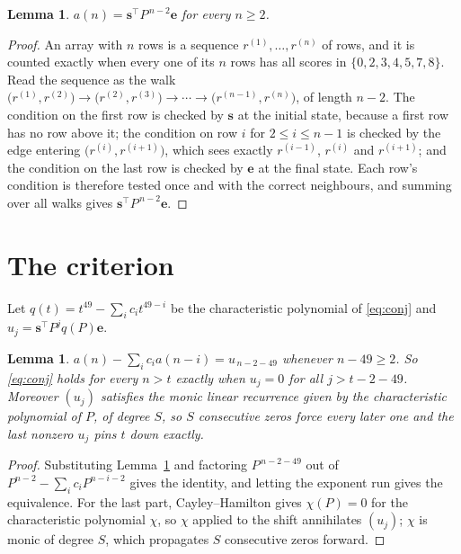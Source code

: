\documentclass[11pt,a4paper]{article}
\theoremstyle{plain}
\newtheorem{lemma}[theorem]{Lemma}
\theoremstyle{definition}
\begin{document}
\begin{lemma}\label{lem:walk}
$a(n)=\mathbf{s}^{\!\top}P^{\,n-2}\mathbf{e}$ for every $n\ge2$.
\end{lemma}

\begin{proof}
An array with $n$ rows is a sequence $r^{(1)},\dots,r^{(n)}$ of rows, and it is counted
exactly when every one of its $n$ rows has all scores in $\{0,2,3,4,5,7,8\}$. Read the sequence as the
walk $\bigl(r^{(1)},r^{(2)}\bigr)\to\bigl(r^{(2)},r^{(3)}\bigr)\to\cdots\to
\bigl(r^{(n-1)},r^{(n)}\bigr)$, of length $n-2$. The condition on the first row is
checked by $\mathbf{s}$ at the initial state, because a first row has no row above it; the
condition on row $i$ for $2\le i\le n-1$ is checked by the edge entering
$\bigl(r^{(i)},r^{(i+1)}\bigr)$, which sees exactly $r^{(i-1)}$, $r^{(i)}$ and
$r^{(i+1)}$; and the condition on the last row is checked by $\mathbf{e}$ at the final
state. Each row's condition is therefore tested once and with the correct neighbours, and
summing over all walks gives $\mathbf{s}^{\!\top}P^{\,n-2}\mathbf{e}$.
\end{proof}

\section{The criterion}

Let $q(t)=t^{49}-\sum_i c_i t^{49-i}$ be the characteristic polynomial of
\eqref{eq:conj} and $u_j=\mathbf{s}^{\!\top}P^{j}q(P)\mathbf{e}$.

\begin{lemma}\label{lem:crit}
$a(n)-\sum_i c_i a(n-i)=u_{\,n-2-49}$ whenever $n-49\ge2$. So \eqref{eq:conj}
holds for every $n>t$ exactly when $u_j=0$ for all $j>t-2-49$. Moreover $(u_j)$
satisfies the monic linear recurrence given by the characteristic polynomial of $P$, of
degree $S$, so $S$ consecutive zeros force every later one and the last nonzero $u_j$ pins
$t$ down exactly.
\end{lemma}

\begin{proof}
Substituting Lemma~\ref{lem:walk} and factoring $P^{\,n-2-49}$ out of
$P^{n-2}-\sum_i c_i P^{n-i-2}$ gives the identity, and letting the exponent run gives the
equivalence. For the last part, Cayley--Hamilton gives $\chi(P)=0$ for the characteristic
polynomial $\chi$, so $\chi$ applied to the shift annihilates $(u_j)$; $\chi$ is monic of
degree $S$, which propagates $S$ consecutive zeros forward.
\end{proof}
\end{document}
